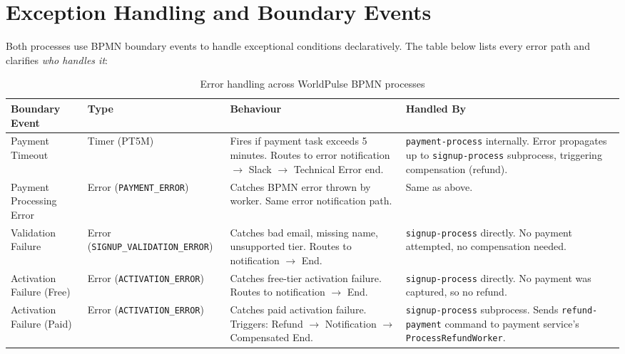 \documentclass[10pt,a4paper]{article}
\begin{document}


\section{Exception Handling and Boundary Events}

Both processes use BPMN boundary events to handle exceptional conditions declaratively. The table below lists every error path and clarifies \emph{who handles it}:

\begin{table}[h]
    \centering
    \caption{Error handling across WorldPulse BPMN processes}
    \small
    \begin{tabular}{
        >{\raggedright\arraybackslash}p{}
        >{\raggedright\arraybackslash}p{}
        >{\raggedright\arraybackslash}p{}
        >{\raggedright\arraybackslash}p{}
    }
    \toprule
    \textbf{Boundary Event} & \textbf{Type} & \textbf{Behaviour} & \textbf{Handled By} \\
    \midrule
    Payment Timeout & Timer (PT5M) & Fires if payment task exceeds 5 minutes. Routes to error notification $\rightarrow$ Slack $\rightarrow$ Technical Error end. & \texttt{payment-process} internally. Error propagates up to \texttt{signup-process} subprocess, triggering compensation (refund). \\
    \addlinespace
    Payment Processing Error & Error (\texttt{PAYMENT\_ERROR}) & Catches BPMN error thrown by worker. Same error notification path. & Same as above. \\
    \addlinespace
    Validation Failure & Error (\texttt{SIGNUP\_VALIDATION\_ERROR}) & Catches bad email, missing name, unsupported tier. Routes to notification $\rightarrow$ End. & \texttt{signup-process} directly. No payment attempted, no compensation needed. \\
    \addlinespace
    Activation Failure (Free) & Error (\texttt{ACTIVATION\_ERROR}) & Catches free-tier activation failure. Routes to notification $\rightarrow$ End. & \texttt{signup-process} directly. No payment was captured, so no refund. \\
    \addlinespace
    Activation Failure (Paid) & Error (\texttt{ACTIVATION\_ERROR}) & Catches paid activation failure. Triggers: Refund $\rightarrow$ Notification $\rightarrow$ Compensated End. & \texttt{signup-process} subprocess. Sends \texttt{refund-payment} command to payment service's \texttt{ProcessRefundWorker}. \\
    \bottomrule
    \end{tabular}
\end{table}
\end{document}
